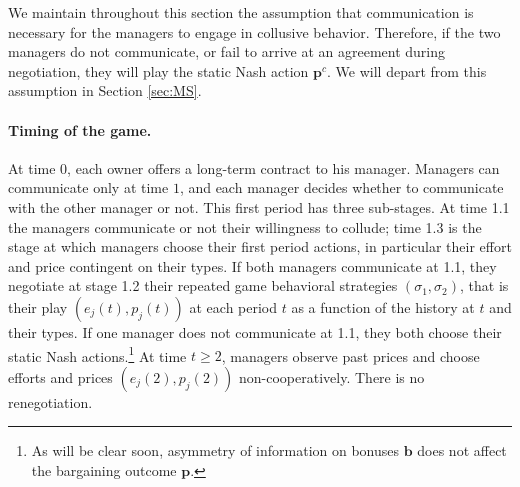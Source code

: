 \documentclass[]{article}
\newcommand{\p}{\mathbf p}
\begin{document}
We maintain throughout this section the assumption that communication is necessary for the managers to engage in collusive behavior. Therefore, if the two managers do not communicate, or fail to arrive at an agreement during negotiation, they will play the static Nash action $\p^c$. We will depart from this assumption in Section \ref{sec:MS}.
%
\paragraph{Timing of the game.} At time $0$, each owner offers a long-term contract to his manager. Managers can communicate only at time $1$, and each manager decides whether to communicate with the other manager or not. This first period has three sub-stages. At time 1.1 the managers communicate or not their willingness to collude; time 1.3 is the stage at which managers choose their first period actions, in particular their effort and price contingent on their types. If both managers communicate at 1.1, they negotiate at stage 1.2 their repeated game behavioral strategies $(\sigma_1,\sigma_2)$, that is their play $(e_j(t),p_j(t))$ at each period $t$ as a function of the history at $t$ and their types. If one manager does not communicate at 1.1, they both choose their static Nash actions.\footnote{As will be clear soon, asymmetry of information on bonuses $\mathbf b$ does not affect the bargaining outcome $\p$.} At time $t\geq 2$, managers observe past prices and choose efforts and prices $(e_j(2),p_j(2))$ non-cooperatively. There is no renegotiation. 
\end{document}
